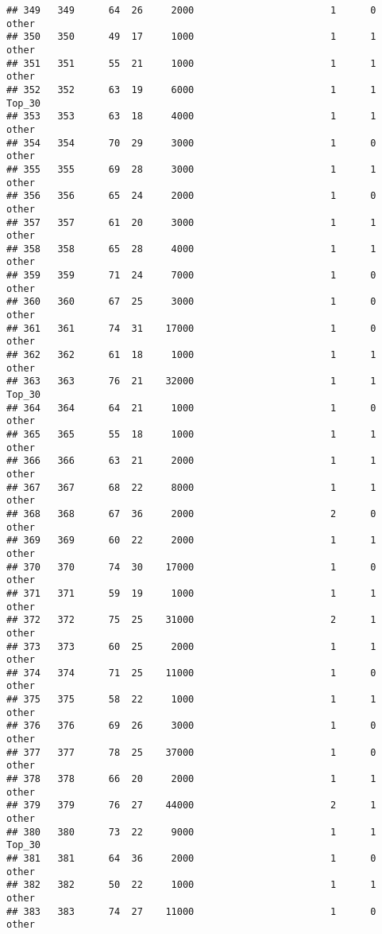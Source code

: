 \documentclass[
]{article}
\begin{document}
\begin{verbatim}
## 349   349      64  26     2000                        1      0    other
## 350   350      49  17     1000                        1      1    other
## 351   351      55  21     1000                        1      1    other
## 352   352      63  19     6000                        1      1   Top_30
## 353   353      63  18     4000                        1      1    other
## 354   354      70  29     3000                        1      0    other
## 355   355      69  28     3000                        1      1    other
## 356   356      65  24     2000                        1      0    other
## 357   357      61  20     3000                        1      1    other
## 358   358      65  28     4000                        1      1    other
## 359   359      71  24     7000                        1      0    other
## 360   360      67  25     3000                        1      0    other
## 361   361      74  31    17000                        1      0    other
## 362   362      61  18     1000                        1      1    other
## 363   363      76  21    32000                        1      1   Top_30
## 364   364      64  21     1000                        1      0    other
## 365   365      55  18     1000                        1      1    other
## 366   366      63  21     2000                        1      1    other
## 367   367      68  22     8000                        1      1    other
## 368   368      67  36     2000                        2      0    other
## 369   369      60  22     2000                        1      1    other
## 370   370      74  30    17000                        1      0    other
## 371   371      59  19     1000                        1      1    other
## 372   372      75  25    31000                        2      1    other
## 373   373      60  25     2000                        1      1    other
## 374   374      71  25    11000                        1      0    other
## 375   375      58  22     1000                        1      1    other
## 376   376      69  26     3000                        1      0    other
## 377   377      78  25    37000                        1      0    other
## 378   378      66  20     2000                        1      1    other
## 379   379      76  27    44000                        2      1    other
## 380   380      73  22     9000                        1      1   Top_30
## 381   381      64  36     2000                        1      0    other
## 382   382      50  22     1000                        1      1    other
## 383   383      74  27    11000                        1      0    other

\end{verbatim}
\end{document}
